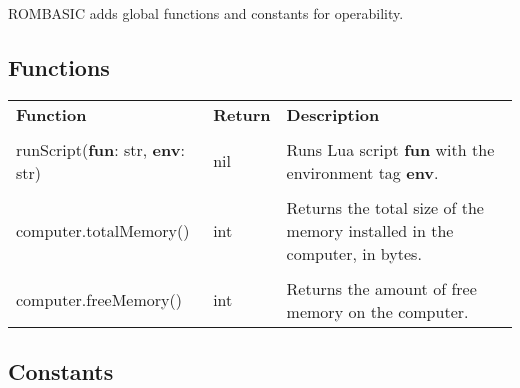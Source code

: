 ROMBASIC adds global functions and constants for operability.

\subsection{Functions}

\begin{tabularx}{\textwidth}{l l X}
	\textbf{\large Function} & \textbf{\large Return} & \textbf{\large Description}
	\\ \\
	\endhead
	\unemph{\_G.}runScript(\textbf{fun}: str, \textbf{env}: str) & nil & Runs Lua script \textbf{fun} with the environment tag \textbf{env}.
	\\ \\
	computer.totalMemory() & int & Returns the total size of the memory installed in the computer, in bytes.
	\\ \\
	computer.freeMemory() & int & Returns the amount of free memory on the computer.
\end{tabularx}

\subsection{Constants}

